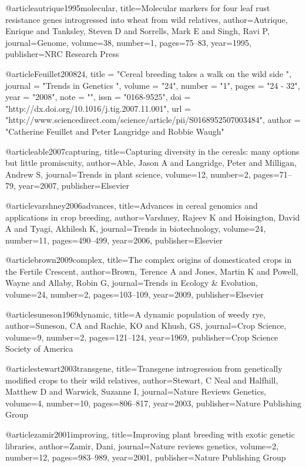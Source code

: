 @article{autrique1995molecular,
  title={Molecular markers for four leaf rust resistance genes introgressed into wheat from wild relatives},
  author={Autrique, Enrique and Tanksley, Steven D and Sorrells, Mark E and Singh, Ravi P},
  journal={Genome},
  volume={38},
  number={1},
  pages={75--83},
  year={1995},
  publisher={NRC Research Press}
}

@article{Feuillet200824,
title = "Cereal breeding takes a walk on the wild side ",
journal = "Trends in Genetics ",
volume = "24",
number = "1",
pages = "24 - 32",
year = "2008",
note = "",
issn = "0168-9525",
doi = "http://dx.doi.org/10.1016/j.tig.2007.11.001",
url = "http://www.sciencedirect.com/science/article/pii/S0168952507003484",
author = "Catherine Feuillet and Peter Langridge and Robbie Waugh"
}

@article{able2007capturing,
  title={Capturing diversity in the cereals: many options but little promiscuity},
  author={Able, Jason A and Langridge, Peter and Milligan, Andrew S},
  journal={Trends in plant science},
  volume={12},
  number={2},
  pages={71--79},
  year={2007},
  publisher={Elsevier}
}

@article{varshney2006advances,
  title={Advances in cereal genomics and applications in crop breeding},
  author={Varshney, Rajeev K and Hoisington, David A and Tyagi, Akhilesh K},
  journal={Trends in biotechnology},
  volume={24},
  number={11},
  pages={490--499},
  year={2006},
  publisher={Elsevier}
}

@article{brown2009complex,
  title={The complex origins of domesticated crops in the Fertile Crescent},
  author={Brown, Terence A and Jones, Martin K and Powell, Wayne and Allaby, Robin G},
  journal={Trends in Ecology \& Evolution},
  volume={24},
  number={2},
  pages={103--109},
  year={2009},
  publisher={Elsevier}
}

@article{suneson1969dynamic,
  title={A dynamic population of weedy rye},
  author={Suneson, CA and Rachie, KO and Khush, GS},
  journal={Crop Science},
  volume={9},
  number={2},
  pages={121--124},
  year={1969},
  publisher={Crop Science Society of America}
}

@article{stewart2003transgene,
  title={Transgene introgression from genetically modified crops to their wild relatives},
  author={Stewart, C Neal and Halfhill, Matthew D and Warwick, Suzanne I},
  journal={Nature Reviews Genetics},
  volume={4},
  number={10},
  pages={806--817},
  year={2003},
  publisher={Nature Publishing Group}
}

@article{zamir2001improving,
  title={Improving plant breeding with exotic genetic libraries},
  author={Zamir, Dani},
  journal={Nature reviews genetics},
  volume={2},
  number={12},
  pages={983--989},
  year={2001},
  publisher={Nature Publishing Group}
}

